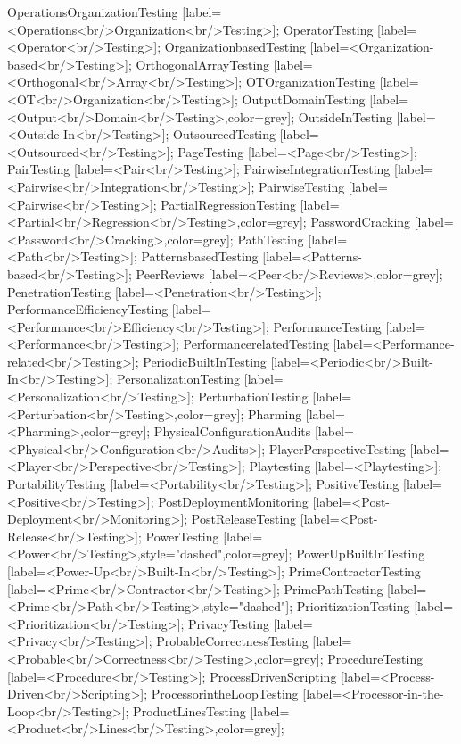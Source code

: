 \documentclass{article}
\begin{document}
{OperationsOrganizationTesting [label=<Operations<br/>Organization<br/>Testing>];
OperatorTesting [label=<Operator<br/>Testing>];
OrganizationbasedTesting [label=<Organization-based<br/>Testing>];
OrthogonalArrayTesting [label=<Orthogonal<br/>Array<br/>Testing>];
OTOrganizationTesting [label=<OT<br/>Organization<br/>Testing>];
OutputDomainTesting [label=<Output<br/>Domain<br/>Testing>,color=grey];
OutsideInTesting [label=<Outside-In<br/>Testing>];
OutsourcedTesting [label=<Outsourced<br/>Testing>];
PageTesting [label=<Page<br/>Testing>];
PairTesting [label=<Pair<br/>Testing>];
PairwiseIntegrationTesting [label=<Pairwise<br/>Integration<br/>Testing>];
PairwiseTesting [label=<Pairwise<br/>Testing>];
PartialRegressionTesting [label=<Partial<br/>Regression<br/>Testing>,color=grey];
PasswordCracking [label=<Password<br/>Cracking>,color=grey];
PathTesting [label=<Path<br/>Testing>];
PatternsbasedTesting [label=<Patterns-based<br/>Testing>];
PeerReviews [label=<Peer<br/>Reviews>,color=grey];
PenetrationTesting [label=<Penetration<br/>Testing>];
PerformanceEfficiencyTesting [label=<Performance<br/>Efficiency<br/>Testing>];
PerformanceTesting [label=<Performance<br/>Testing>];
PerformancerelatedTesting [label=<Performance-related<br/>Testing>];
PeriodicBuiltInTesting [label=<Periodic<br/>Built-In<br/>Testing>];
PersonalizationTesting [label=<Personalization<br/>Testing>];
PerturbationTesting [label=<Perturbation<br/>Testing>,color=grey];
Pharming [label=<Pharming>,color=grey];
PhysicalConfigurationAudits [label=<Physical<br/>Configuration<br/>Audits>];
PlayerPerspectiveTesting [label=<Player<br/>Perspective<br/>Testing>];
Playtesting [label=<Playtesting>];
PortabilityTesting [label=<Portability<br/>Testing>];
PositiveTesting [label=<Positive<br/>Testing>];
PostDeploymentMonitoring [label=<Post-Deployment<br/>Monitoring>];
PostReleaseTesting [label=<Post-Release<br/>Testing>];
PowerTesting [label=<Power<br/>Testing>,style="dashed",color=grey];
PowerUpBuiltInTesting [label=<Power-Up<br/>Built-In<br/>Testing>];
PrimeContractorTesting [label=<Prime<br/>Contractor<br/>Testing>];
PrimePathTesting [label=<Prime<br/>Path<br/>Testing>,style="dashed"];
PrioritizationTesting [label=<Prioritization<br/>Testing>];
PrivacyTesting [label=<Privacy<br/>Testing>];
ProbableCorrectnessTesting [label=<Probable<br/>Correctness<br/>Testing>,color=grey];
ProcedureTesting [label=<Procedure<br/>Testing>];
ProcessDrivenScripting [label=<Process-Driven<br/>Scripting>];
ProcessorintheLoopTesting [label=<Processor-in-the-Loop<br/>Testing>];
ProductLinesTesting [label=<Product<br/>Lines<br/>Testing>,color=grey];
}
\end{document}

